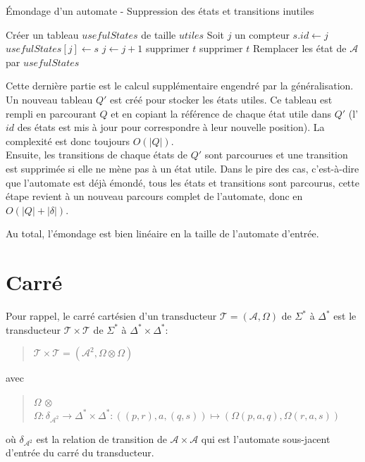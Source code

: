 	\begin{algorithm}
		\caption{\'{E}mondage d'un automate - Suppression des états et transitions inutiles}
		\begin{algorithmic}[1]
						
			
			\Statex
			\State Créer un tableau $usefulStates$ de taille $utiles$ 
			\State Soit $j$ un compteur
					\State $s.id \gets j$
					\State $usefulStates[j] \gets s$
					\State $j \gets j + 1$
				\EndIf
			\EndFor
						\State supprimer $t$
					\EndIf
				\EndFor
						\State supprimer $t$
					\EndIf
				\EndFor
			\EndFor
			\State Remplacer les état de $\mathscr{A}$ par $usefulStates$
		\end{algorithmic}
	\end{algorithm}

	Cette dernière partie est le calcul supplémentaire engendré par la généralisation. Un nouveau tableau $Q'$ est créé pour stocker les états utiles. Ce tableau est rempli en parcourant $Q$ et en copiant la référence de chaque état utile dans $Q'$ (l'$id$ des états est mis à jour pour correspondre à leur nouvelle position). La complexité est donc toujours $O(|Q|)$. \\
	Ensuite, les transitions de chaque états de $Q'$ sont parcourues et une transition est supprimée si elle ne mène pas à un état utile. Dans le pire des cas, c'est-à-dire que l'automate est déjà émondé, tous les états et transitions sont parcourus, cette étape revient à un nouveau parcours complet de l'automate, donc en $O(|Q| + |\delta|)$.
	
	Au total, l'émondage est bien linéaire en la taille de l'automate d'entrée.
	
\section{Carré}
\label{carré}

	Pour rappel, le carré cartésien d'un transducteur $\mathscr{T} = (\mathscr{A}, \Omega)$ de $\Sigma^*$ à $\Delta^*$ est le transducteur $\mathscr{T} \times \mathscr{T}$ de $\Sigma^*$ à $\Delta^* \times \Delta^*$:
	\begin{quotation}
		$\mathscr{T} \times \mathscr{T} = (\mathscr{A}^2, \Omega \otimes \Omega)$
	\end{quotation}
	avec
	\begin{quotation}
		$\Omega$ $\otimes$ $\Omega : \delta_{\mathscr{A}^2} \to \Delta^* \times \Delta^* : ((p,r),a,(q,s)) \mapsto (\Omega(p,a,q),\Omega(r,a,s))$
	\end{quotation}
	où $\delta_{\mathscr{A}^2}$ est la relation de transition de $\mathscr{A} \times \mathscr{A}$ qui est l'automate sous-jacent d'entrée du carré du transducteur.
	
